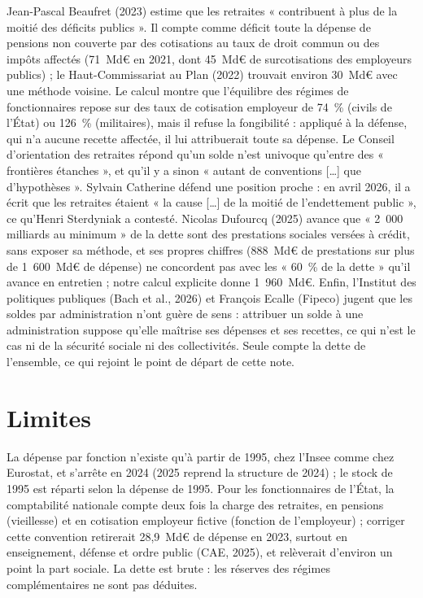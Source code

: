 \documentclass[11pt,a4paper]{article}
\begin{document}
Jean-Pascal Beaufret (2023) estime que les retraites « contribuent à plus de la moitié des déficits
publics ». Il compte comme déficit toute la dépense de pensions non couverte par des cotisations au
taux de droit commun ou des impôts affectés (71~Md€ en 2021, dont 45~Md€ de surcotisations des
employeurs publics) ; le Haut-Commissariat au Plan (2022) trouvait environ 30~Md€ avec une méthode
voisine. Le calcul montre que l'équilibre des régimes de fonctionnaires repose sur des
taux de cotisation employeur de 74~\% (civils de l'État) ou 126~\% (militaires), mais il refuse la
fongibilité : appliqué à la défense, qui n'a aucune recette affectée, il lui attribuerait toute sa
dépense. Le Conseil d'orientation des retraites répond qu'un solde n'est univoque qu'entre des
« frontières étanches », et qu'il y a sinon « autant de conventions […] que d'hypothèses ». Sylvain
Catherine défend une position proche : en avril 2026, il a écrit que les retraites étaient « la
cause […] de la moitié de l'endettement public », ce qu'Henri Sterdyniak a contesté. Nicolas Dufourcq (2025) avance que « 2~000 milliards au minimum » de la
dette sont des prestations sociales versées à crédit, sans exposer sa méthode, et ses propres chiffres
(888~Md€ de prestations sur plus de 1~600~Md€ de dépense) ne concordent pas avec les « 60~\% de la
dette » qu'il avance en entretien ; notre calcul explicite donne 1~960~Md€. Enfin, l'Institut des politiques publiques (Bach et al., 2026) et
François Ecalle (Fipeco) jugent que les soldes par administration n'ont guère de sens : attribuer un
solde à une administration suppose qu'elle maîtrise ses dépenses et ses recettes, ce qui n'est le
cas ni de la sécurité sociale ni des collectivités. Seule compte la dette de l'ensemble, ce qui
rejoint le point de départ de cette note.

\section{Limites}\label{sec:limites}

La dépense par fonction n'existe qu'à partir de 1995, chez l'Insee comme chez Eurostat, et s'arrête
en 2024 (2025 reprend la structure de 2024) ; le stock de 1995 est réparti selon la dépense de 1995.
Pour les fonctionnaires de l'État, la comptabilité nationale compte deux fois la charge des
retraites, en pensions (vieillesse) et en cotisation employeur fictive (fonction de l'employeur) ;
corriger cette convention retirerait 28,9~Md€ de dépense en 2023, surtout en enseignement, défense
et ordre public (CAE, 2025), et relèverait d'environ un point la part sociale. La dette est brute :
les réserves des régimes complémentaires ne sont pas déduites.
\end{document}
